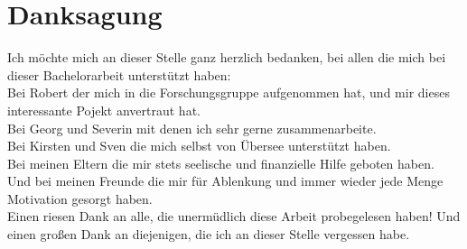 \thispagestyle{empty}

\section*{Danksagung}

Ich möchte mich an dieser Stelle ganz herzlich bedanken, bei allen die mich bei dieser Bachelorarbeit unterstützt haben: \\

Bei Robert der mich in die Forschungsgruppe aufgenommen hat, und mir dieses interessante Pojekt anvertraut hat. \\

Bei Georg und Severin mit denen ich sehr gerne zusammenarbeite. \\

Bei Kirsten und Sven die mich selbst von Übersee unterstützt haben. \\

Bei meinen Eltern die mir stets seelische und finanzielle Hilfe geboten haben. \\

Und bei meinen Freunde die mir für Ablenkung und immer wieder jede Menge Motivation gesorgt haben. \\

Einen riesen Dank an alle, die unermüdlich diese Arbeit probegelesen haben!
Und einen großen Dank an diejenigen, die ich an dieser Stelle vergessen habe.

